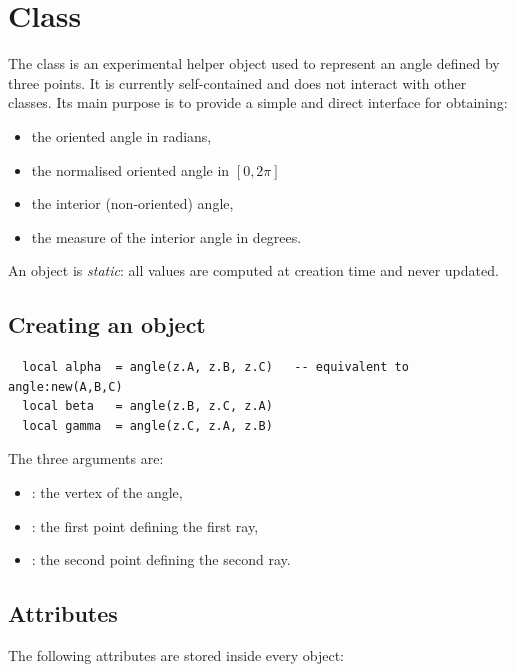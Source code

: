 \newpage
\section{Class }
\label{sec:class_angle}

The  class is an experimental helper object used to represent
an angle defined by three points.
It is currently self-contained and does not interact with other classes.
Its main purpose is to provide a simple and direct interface for obtaining:

\begin{itemize}
  \item the oriented angle in radians,
  \item the normalised oriented angle in $[0, 2\pi]$
  \item the interior (non-oriented) angle,
  \item the measure of the interior angle in degrees.
\end{itemize}

An  object is \emph{static}: all values are computed at creation
time and never updated.

\subsection{Creating an object}
\label{ssub:method_angle_new}

\begin{verbatim}
  local alpha  = angle(z.A, z.B, z.C)   -- equivalent to angle:new(A,B,C)
  local beta   = angle(z.B, z.C, z.A)
  local gamma  = angle(z.C, z.A, z.B)
\end{verbatim}

The three arguments are:
\begin{itemize}
  \item {}: the vertex of the angle,
  \item {}: the first point defining the first ray,
  \item {}: the second point defining the second ray.
\end{itemize}

\subsection{Attributes}

The following attributes are stored inside every  object:

